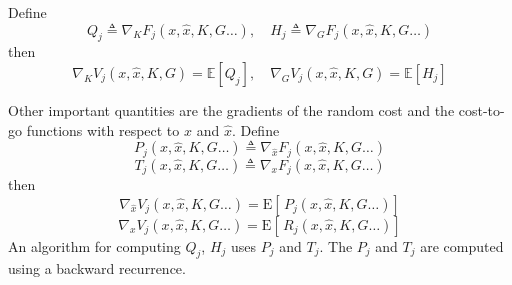 \documentclass{article}
\begin{document}
\noindent Define 
\[
Q_j \triangleq \nabla_K F_j(x, \widehat{x},K,G\ldots), \quad H_j \triangleq \nabla_G F_j(x, \widehat{x},K,G\ldots)
\]
then 
\[
\nabla_K V_j(x,\widehat{x},K,G) = \mathbb{E}[Q_j], \quad \nabla_G V_j(x,\widehat{x},K,G) = \mathbb{E}[H_j]
\]

\noindent Other important quantities are the gradients of the random cost and the cost-to-go functions with respect
to $x$ and $\widehat{x}$.
Define
\[
P_j(x,\widehat{x},K,G\ldots) \triangleq \nabla_{\widehat{x}} F_j(x,\widehat{x},K,G\ldots)
\]
\[
T_j(x,\widehat{x},K,G\ldots) \triangleq \nabla_{x} F_j(x,\widehat{x},K,G\ldots)
\]
then
\[
\nabla_{\widehat{x}} V_j(x, \widehat{x},K,G\ldots) 
= \text{E} \!\left[\, P_j(x,\widehat{x},K,G\ldots)\right]
\]
\[
\nabla_{x} V_j(x, \widehat{x},K,G\ldots) 
= \text{E} \!\left[\, R_j(x,\widehat{x},K,G\ldots)\right]
\]
An algorithm for computing $Q_j$, $H_j$ uses $P_j$ and $T_j$.
The $P_j$ and $T_j$ are computed using a backward recurrence.
\end{document}
